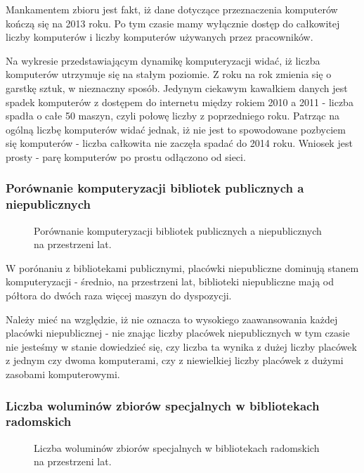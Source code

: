 \documentclass[12pt]{article}
\begin{document}
Mankamentem zbioru jest fakt, iż dane dotyczące przeznaczenia komputerów kończą się na 2013 roku. Po tym czasie mamy wyłącznie dostęp do całkowitej liczby komputerów i 
liczby komputerów używanych przez pracowników. 

Na wykresie przedstawiającym dynamikę komputeryzacji widać, iż liczba komputerów utrzymuje się na stałym poziomie. Z roku na rok zmienia się o garstkę sztuk, 
w nieznaczny sposób. 
Jedynym ciekawym kawałkiem danych jest spadek komputerów z dostępem do internetu między rokiem 2010 a 2011 - liczba spadła o całe 50 maszyn, czyli połowę liczby z 
poprzedniego roku. Patrząc na ogólną liczbę komputerów widać jednak, iż nie jest to spowodowane pozbyciem się komputerów - liczba całkowita nie zaczęła spadać do 2014 roku.
Wniosek jest prosty - parę komputerów po prostu odłączono od sieci.


\subsubsection{Porównanie komputeryzacji bibliotek publicznych a niepublicznych}
\begin{figure}[H]
    
    \caption{Porównanie komputeryzacji bibliotek publicznych a niepublicznych na przestrzeni lat.}
\end{figure}

W porónaniu z bibliotekami publicznymi, placówki niepubliczne dominują stanem komputeryzacji - średnio, na przestrzeni lat, biblioteki niepubliczne mają od półtora do dwóch 
raza więcej maszyn do dyspozycji.

Należy mieć na względzie, iż nie oznacza to wysokiego zaawansowania każdej placówki niepublicznej - nie znając liczby placówek niepublicznych w tym czasie 
nie jesteśmy w stanie dowiedzieć się, czy liczba ta wynika z dużej liczby placówek z jednym czy dwoma komputerami, czy z niewielkiej liczby placówek z dużymi 
zasobami komputerowymi.

\subsubsection{Liczba woluminów zbiorów specjalnych w bibliotekach radomskich}
\begin{figure}[H]
    
    \caption{Liczba woluminów zbiorów specjalnych w bibliotekach radomskich na przestrzeni lat.}
\end{figure}
\end{document}
